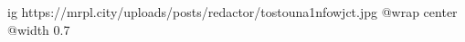  
 
 
 
 

\ifcmt
  ig https://mrpl.city/uploads/posts/redactor/tostouna1nfowjct.jpg
  @wrap center
  @width 0.7
\fi
